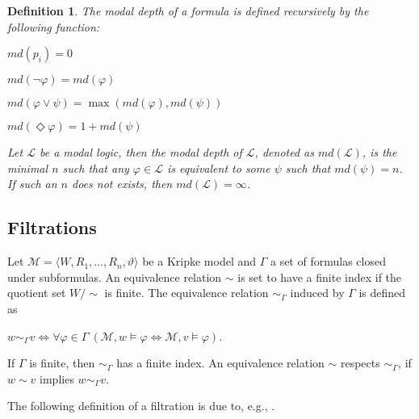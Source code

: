 \documentclass[a4paper]{article}
\theoremstyle{defin}
\newtheorem{defin}{Definition}
\theoremstyle{theorem}
\theoremstyle{prop}
\theoremstyle{lemma}
\theoremstyle{fact}
\theoremstyle{ex}
\theoremstyle{col}
\theoremstyle{claim}
\begin{document}
\begin{defin}
The modal depth of a formula is defined recursively by the following function:
\begin{center}
  $md(p_i) = 0$

  $md(\neg \varphi) = md(\varphi)$

  $md(\varphi \lor \psi) = \max(md(\varphi), md(\psi))$

  $md(\Diamond \varphi) = 1 + md(\psi)$
\end{center}

Let $\mathcal{L}$ be a modal logic, then the modal depth of $\mathcal{L}$, denoted as $md(\mathcal{L})$, is the minimal $n$ such that any $\varphi \in \mathcal{L}$ is equivalent to some $\psi$ such that $md(\psi) = n$. If such an $n$ does not exists, then $md(\mathcal{L}) = \infty$.
\end{defin}

\subsection{Filtrations}

Let $\mathcal{M} = \langle W, R_1, \dots, R_n, \vartheta \rangle$ be a Kripke model and $\Gamma$ a set of formulas closed under subformulas. An equivalence relation $\sim$ is set to have a finite index if the quotient set $W / \sim$ is finite. The equivalence relation $\sim_{\Gamma}$ induced by $\Gamma$ is defined as

\begin{center}
  $w \sim_{\Gamma} v \Leftrightarrow \forall \varphi \in \Gamma \: (\mathcal{M}, w \models \varphi \Leftrightarrow \mathcal{M}, v \models \varphi)$.
\end{center}

If $\Gamma$ is finite, then $\sim_{\Gamma}$ has a finite index. An equivalence relation $\sim$ respects $\sim_{\Gamma}$, if $w \sim v$ implies $w \sim_{\Gamma} v$.

The following definition of a filtration is due to, e.g., \cite{shehtman2004filtration}.
\end{document}
